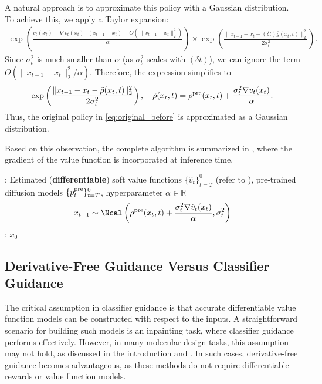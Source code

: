 A natural approach is to approximate this policy with a Gaussian distribution. To achieve this, we apply a Taylor expansion:
\begin{align*}
  \exp\left ( \frac{v_t(x_t) + \nabla v_{t}(x_{t})\cdot (x_{t-1}-x_{t}) + O(\|x_{t-1}-x_t\|^2_2)  }{\alpha} \right)  \times \exp\left (\frac{\|x_{t-1}-x_t- (\delta t) \bar g(x_t,t) \|^2_2}{2\sigma^2_t} \right).        
\end{align*}
Since $\sigma^2_t$ is much smaller than $\alpha$ (as $\sigma^2_t$ scales with $(\delta t)$), we can ignore the term $O(\|x_{t-1} - x_t\|^2_2 / \alpha)$. Therefore, the expression simplifies to 
\begin{align*}
   \exp\left (\frac{\|x_{t-1}-x_t - \tilde \rho(x_t,t)\|^2_2}{2\sigma^2_t} \right), \quad  \tilde \rho(x_t,t)=\rho^{\mathrm{pre}}(x_t,t)+\frac{\sigma^2_t \nabla v_{t}(x_t) }{\alpha}. 
\end{align*}
Thus, the original policy in \eqref{eq:original_before} is approximated as a Gaussian distribution.

Based on this observation, the complete algorithm is summarized in , where the gradient of the value function is incorporated at inference time.

\begin{algorithm}[!th]
\caption{Classifier Guidance in Continuous Diffusion Models \citep{dhariwal2021diffusion,song2021score} }\label{alg:deri}
\begin{algorithmic}[1]
     : Estimated (\textbf{differentiable}) soft value functions $\{\hat v_t\}_{t=T}^0$ (refer to ), pre-trained diffusion models $\{p^{\mathrm{pre}}_t\}_{t=T}^0$, hyperparameter $\alpha \in \mathbb{R}$
        \STATE $$ x_{t-1} \sim \Ncal\left (\rho^{\pre}(x_t,t)+\frac{\sigma^2_t \nabla \hat v_{t}(x_t) }{\alpha},\sigma^2_t \right) $$
     \ENDFOR
  : $x_0$
\end{algorithmic}
\end{algorithm}

\subsection{Derivative-Free Guidance Versus Classifier Guidance}

The critical assumption in classifier guidance is that accurate differentiable value function models can be constructed with respect to the inputs. A straightforward scenario for building such models is an inpainting task, where classifier guidance performs effectively. However, in many molecular design tasks, this assumption may not hold, as discussed in the introduction and . In such cases, derivative-free guidance becomes advantageous, as these methods do not require differentiable rewards or value function models. 

